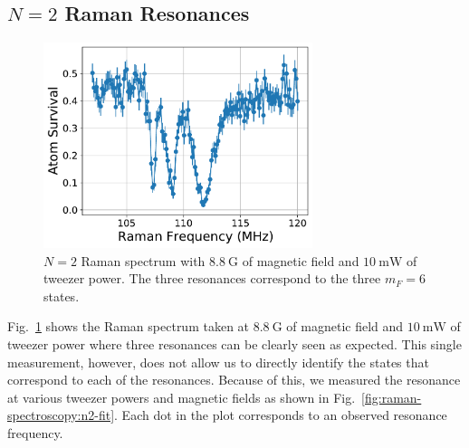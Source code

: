 \subsection{\texorpdfstring{$N=2$}{N=2} Raman Resonances}
\label{ch:raman-spectroscopy:n2:resonances}

\begin{figure}
  \centering
  \includegraphics[width=0.7\textwidth]{figures/raman_spectroscopy_n2_resonance.pdf}
  \caption[$N=2$ Raman spectrum.]{
    $N=2$ Raman spectrum with $8.8~\mathrm{G}$ of magnetic field
    and $10~\mathrm{mW}$ of tweezer power.
    The three resonances correspond to the three $m_F=6$ states.
    \label{fig:raman-spectroscopy:n2}}
\end{figure}

Fig.~\ref{fig:raman-spectroscopy:n2} shows the Raman spectrum taken
at $8.8~\mathrm{G}$ of magnetic field and $10~\mathrm{mW}$ of tweezer power
where three resonances can be clearly seen as expected.
This single measurement, however, does not allow us to directly identify the states
that correspond to each of the resonances.
Because of this, we measured the resonance at various tweezer powers and magnetic fields
as shown in Fig.~\ref{fig:raman-spectroscopy:n2-fit}.
Each dot in the plot corresponds to an observed resonance frequency.

